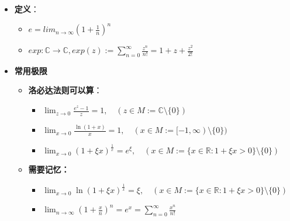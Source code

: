 \documentclass[a4paper,12pt]{article}
\begin{document}
\begin{itemize}
\item
  \textbf{定义}：

  \begin{itemize}
  \item
    \(e = lim_{n \to \infty} (1 + \frac{1}{n})^n\)
  \item
    \(exp: \mathbb{C} \to \mathbb{C}, exp(z) := \sum_{n = 0}^\infty \frac{z^n}{n!} = 1+ z + \frac{z^2}{2!}\)
  \end{itemize}
\item
  \textbf{常用极限}

  \begin{itemize}
  \item
    \textbf{洛必达法则可以算}：

    \begin{itemize}
    \item
      \(\lim_{z\to 0} \frac{e^z-1}{z} = 1, \quad (z \in M := \mathbb{C}\setminus\{0\})\)
    \item
      \(\lim_{x\to 0} \frac{\ln(1+x)}{x} = 1, \quad (x \in M := [-1,\infty)\setminus\{0\})\)
    \item
      \(\lim_{x\to 0} (1+\xi x)^{\frac{1}{x}} = e^\xi, \quad (x \in M := \{x \in \mathbb{R}: 1+\xi x > 0\}\setminus\{0\})\)
    \end{itemize}
  \item
    \textbf{需要记忆：}

    \begin{itemize}
    \item
      \(\lim_{x\to 0} \ln(1+\xi x)^{\frac{1}{x}} = \xi, \quad (x \in M := \{x \in \mathbb{R}: 1+\xi x > 0\}\setminus\{0\})\)
    \item
      \(\lim_{n\to\infty} (1+\frac{x}{n})^n = e^x = \sum_{n=0}^{\infty} \frac{x^n}{n!}\)
    \end{itemize}
  \end{itemize}
\end{itemize}
\end{document}
